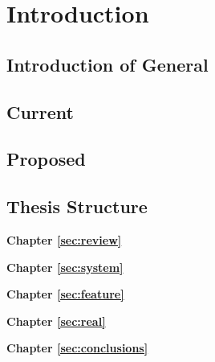 %
\chapter{Introduction}
\label{sec:intro}


\blindtext

\section{Introduction of General}
\label{sec:intro:general}

\blindtext

\section{Current}
\label{sec:intro:current}

\blindtext

\section{Proposed}
\label{sec:intro:new}

\blindtext

\section{Thesis Structure}
\label{sec:intro:structure}

\textbf{Chapter \ref{sec:review}} \\[0.2em]
\blindtext

\textbf{Chapter \ref{sec:system}} \\[0.2em]
\blindtext

\textbf{Chapter \ref{sec:feature}} \\[0.2em]
\blindtext

\textbf{Chapter \ref{sec:real}} \\[0.2em]
\blindtext

\textbf{Chapter \ref{sec:conclusions}} \\[0.2em]
\blindtext
